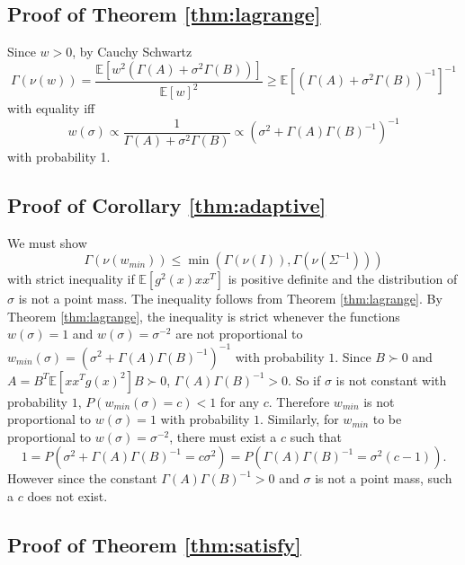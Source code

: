 \documentclass[ejs,ps,preprint]{imsart}
\numberwithin{equation}{section}
\theoremstyle{plain}
\newcommand{\E}{\mathbb{E}}
\def\E{\mathbb{E}}
\begin{document}
\subsection{Proof of Theorem \ref{thm:lagrange}}
\label{prf:lagrange}

Since $w > 0$, by Cauchy Schwartz
\begin{equation*}
\Gamma(\nu(w)) = \frac{\E[w^2(\Gamma(A) + \sigma^2\Gamma(B))]}{\E[w]^2} \geq \E[(\Gamma(A) + \sigma^2\Gamma(B))^{-1}]^{-1}
\end{equation*}
with equality iff
\begin{equation*}
  w(\sigma) \propto \frac{1}{\Gamma(A) + \sigma^2\Gamma(B)} \propto (\sigma^2 + \Gamma(A)\Gamma(B)^{-1})^{-1}
\end{equation*}
with probability 1.

\subsection{Proof of Corollary \ref{thm:adaptive}}
\label{prf:adaptive}
We must show
\begin{equation*}
\Gamma(\nu(w_{min})) \leq \min(\Gamma(\nu(I)),\Gamma(\nu(\Sigma^{-1})))
\end{equation*}
with strict inequality if $\E[g^2(x)xx^T]$ is positive definite and the distribution of $\sigma$ is not a point mass. The inequality follows from Theorem \ref{thm:lagrange}. By Theorem \ref{thm:lagrange}, the inequality is strict whenever the functions $w(\sigma) = 1$ and $w(\sigma) = \sigma^{-2}$ are not proportional to $w_{min}(\sigma) = (\sigma^2 + \Gamma(A)\Gamma(B)^{-1})^{-1}$ with probability $1$. Since $B \succ 0$ and $A = B^T\E[xx^Tg(x)^2]B \succ 0$, $\Gamma(A)\Gamma(B)^{-1} > 0$. So if $\sigma$ is not constant with probability $1$, $P(w_{min}(\sigma) = c) < 1$ for any $c$. Therefore $w_{min}$ is not proportional to $w(\sigma) = 1$ with probability $1$. Similarly, for $w_{min}$ to be proportional to $w(\sigma) = \sigma^{-2}$, there must exist a $c$ such that
\begin{equation*}
1 = P(\sigma^2 + \Gamma(A)\Gamma(B)^{-1} = c\sigma^2) = P(\Gamma(A)\Gamma(B)^{-1} = \sigma^2(c-1)).
\end{equation*}
However since the constant $\Gamma(A)\Gamma(B)^{-1} > 0$ and $\sigma$ is not a point mass, such a $c$ does not exist.


\subsection{Proof of Theorem \ref{thm:satisfy}}
\label{prf:satisfy}
\end{document}
